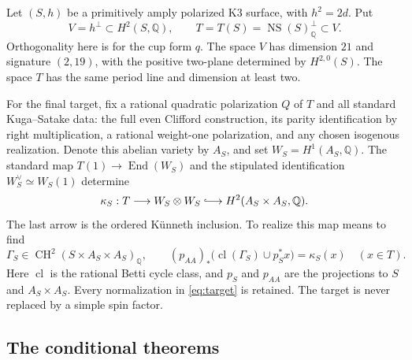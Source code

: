 Let $(S,h)$ be a primitively amply polarized K3 surface, with $h^2=2d$. Put
\[
 V=h^\perp\subset H^2(S,\mathbb Q),\qquad
 T=T(S)=\operatorname{NS}(S)_{\mathbb Q}^{\perp}\subset V.
\]
Orthogonality here is for the cup form $q$. The space $V$ has dimension $21$ and signature $(2,19)$, with the positive two-plane determined by $H^{2,0}(S)$. The space $T$ has the same period line and dimension at least two.

For the final target, fix a rational quadratic polarization $Q$ of $T$ and all standard Kuga--Satake data: the full even Clifford construction, its parity identification by right multiplication, a rational weight-one polarization, and any chosen isogenous realization. Denote this abelian variety by $A_S$, and set $W_S=H^1(A_S,\mathbb Q)$. The standard map $T(1)\to\operatorname{End}(W_S)$ and the stipulated identification $W_S^\vee\simeq W_S(1)$ determine
\begin{equation}\label{eq:target}
 \kappa_S:T\longrightarrow W_S\otimes W_S
 \lhook\joinrel\longrightarrow H^2(A_S\times A_S,\mathbb Q).
\end{equation}
The last arrow is the ordered K\"unneth inclusion. To realize this map means to find
\begin{equation}\label{eq:cycle-target}
 \Gamma_S\in\operatorname{CH}^2(S\times A_S\times A_S)_{\mathbb Q},
 \qquad
 (p_{AA})_*\bigl(\operatorname{cl}(\Gamma_S)\cup p_S^*x\bigr)
 =\kappa_S(x)\quad(x\in T).
\end{equation}
Here $\operatorname{cl}$ is the rational Betti cycle class, and $p_S$ and $p_{AA}$ are the projections to $S$ and $A_S\times A_S$. Every normalization in \eqref{eq:target} is retained. The target is never replaced by a simple spin factor.

\subsection{The conditional theorems}

